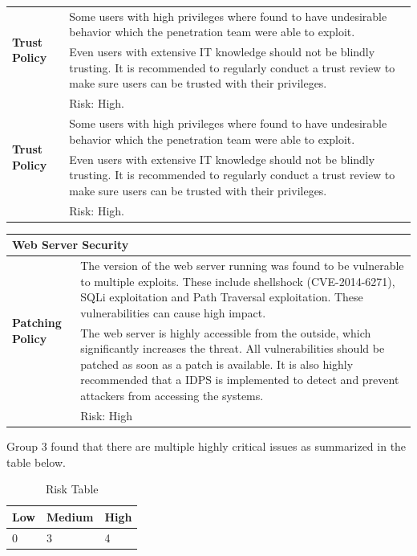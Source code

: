 \begin{longtable}{|l|p{10.5cm}|}
\multirow{2}{*}{\textbf{Trust Policy}} & Some users with high privileges where found to have undesirable behavior which the penetration team were able to exploit.    \\ \cline{2-2} 
                                               & Even users with extensive IT knowledge should not be blindly trusting. It is recommended to regularly conduct a trust review to make sure users can be trusted with their privileges. \\ & Risk: High. \\ \hline


\multirow{2}{*}{\textbf{Trust Policy}} & Some users with high privileges where found to have undesirable behavior which the penetration team were able to exploit.    \\ \cline{2-2} 
                                               & Even users with extensive IT knowledge should not be blindly trusting. It is recommended to regularly conduct a trust review to make sure users can be trusted with their privileges. \\ & Risk: High. \\ \hline

\end{longtable}


\begin{longtable}{|l|p{10.5cm}|} 
\hline
\multicolumn{2}{|l|}{Web Server Security}                              \\ \hline

\multirow{2}{*}{\textbf{Patching Policy}} & The version of the web server running was found to be vulnerable to multiple exploits. These include shellshock (CVE-2014-6271), SQLi exploitation and Path Traversal exploitation. These vulnerabilities can cause high impact.    \\ \cline{2-2} 
                                               & The web server is highly accessible from the outside, which significantly increases the threat. All vulnerabilities should be patched as soon as a patch is available. It is also highly recommended that a IDPS is implemented to detect and prevent attackers from accessing the systems. \\ & Risk: High \\ \hline

\end{longtable}

\newpage
Group 3 found that there are multiple highly critical issues as summarized in the table below.
\begin{table}[h]
\centering
\begin{tabular}{|l|l|l|}
\hline
Low & Medium & High \\ \hline
0   & 3      & 4    \\ \hline
\end{tabular}
\caption{Risk Table}
\end{table}

